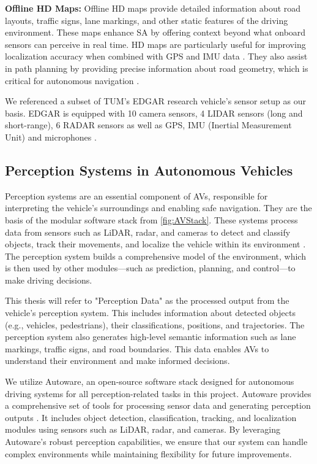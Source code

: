     \textbf{Offline HD Maps:}
    Offline HD maps provide detailed information about road layouts, traffic signs, lane markings, and other static features of the driving environment. These maps enhance \ac{SA} by offering context beyond what onboard sensors can perceive in real time. HD maps are particularly useful for improving localization accuracy when combined with GPS and IMU data \cite{bansal2018hdmaps}. They also assist in path planning by providing precise information about road geometry, which is critical for autonomous navigation \cite{zhu2021hdmaps}.

We referenced a subset of TUM's EDGAR research vehicle's sensor setup as our basis.
EDGAR is equipped with 10 camera sensors, 4 LIDAR sensors (long and short-range), 6 RADAR sensors as well as GPS, IMU (Inertial Measurement Unit) and microphones \cite{tum2023edgar}.

\subsection{Perception Systems in Autonomous Vehicles}
Perception systems are an essential component of \acp{AV}, responsible for interpreting the
vehicle's surroundings and enabling safe navigation. They are the basis of the modular software stack from \ref{fig:AVStack}.
These systems process data from sensors such as LiDAR,
radar, and cameras to detect and classify objects, track their movements, and localize the vehicle within
its environment \cite{liu2018perception}. The perception system builds a comprehensive model of the environment,
which is then used by other modules—such as prediction, planning, and control—to make driving decisions.

This thesis will refer to "Perception Data" as the processed output from the vehicle's perception system. This includes information about detected objects (e.g., vehicles, pedestrians), their classifications, positions, and trajectories. The perception system also generates high-level semantic information such as lane markings, traffic signs, and road boundaries. This data enables \acp{AV} to understand their environment and make informed decisions.

We utilize Autoware, an open-source software stack designed for autonomous driving systems for all perception-related tasks in this project. Autoware provides a comprehensive set of tools for processing sensor data and generating perception outputs \cite{kato2018autoware}. It includes object detection, classification, tracking, and localization modules using sensors such as LiDAR, radar, and cameras. By leveraging Autoware's robust perception capabilities, we ensure that our system can handle complex environments while maintaining flexibility for future improvements.

